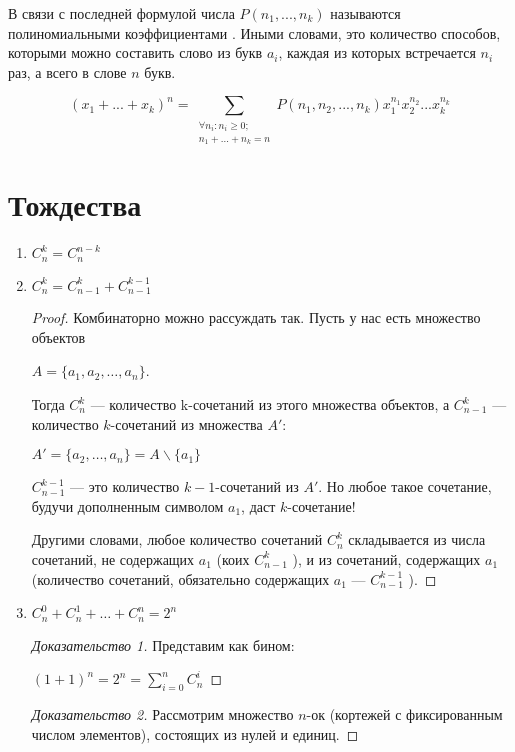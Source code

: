 В связи с последней формулой числа $ P(n_1,...,n_k) $ называются полиномиальными коэффициентами .
Иными словами, это количество способов, которыми можно составить слово из букв $a_i$, каждая из которых встречается $n_i$ раз, а всего в слове $n $ букв.

\[ (x_1 + ... + x_k)^n = \sum _{\substack{
   \forall n_i : n_i\geq 0; \\
 n_1 + ... + n_k = n
    } }
 P(n_1, n_2, ...,n_k)x_1^{n_1}x_2^{n_2}...x_k^{n_k}
\]

\section{Тождества}
\begin{enumerate}
 


\item $ C ^k _n = C^{n-k}_n $

\item $ C^ k _n = C^k _{n-1} + C^{k-1} _{n-1}$

\begin{proof} Комбинаторно можно рассуждать так. Пусть у нас есть множество объектов

$A = \{a_1, a_2,  \dots, a_n\}$.

Тогда $ C^k_n $ --- количество k-сочетаний из этого множества объектов, а $ C^k_{n-1} $ --- количество $k$-сочетаний из множества $A'$:

$A' = \{a_2,  \dots, a_n\} = A \backslash \{a_1\} $

$ C^{k-1}_{n-1} $ --- это количество  $k-1$-сочетаний из $A'$. Но любое такое сочетание, будучи дополненным символом $a_1$, даст $k$-сочетание!

Другими словами, любое количество сочетаний $C^k_n$ складывается из числа сочетаний, не содержащих $a_1$ (коих   $ C^k_{n-1} $  ), и из сочетаний, содержащих $a_1$ (количество сочетаний, обязательно содержащих $a_1$ ---  $ C^{k-1}_{n-1} $ ).
\end{proof}

\item 

$C^0_n + C^1_n + \dots + C^n_n = 2^n$
\begin{proof}[Доказательство 1] 
Представим как бином:

$(1+1)^n = 2^n = \sum \limits _{i=0} ^n {C^ i _n} $
\end{proof}
\begin{proof}[Доказательство 2] 
Рассмотрим множество $n$-ок (кортежей с фиксированным числом элементов), состоящих из нулей и единиц.


\end{proof}
\end{enumerate}
